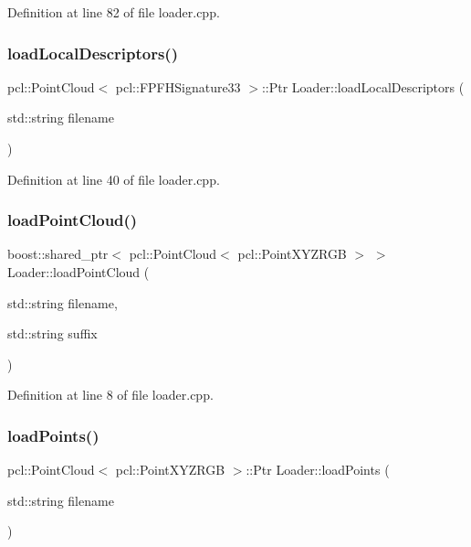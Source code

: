 Definition at line 82 of file loader.\+cpp.

\hypertarget{class_loader_ac8938fa9e01e40c2ff21574df60b003a}{}\label{class_loader_ac8938fa9e01e40c2ff21574df60b003a} 
\subsubsection{\texorpdfstring{load\+Local\+Descriptors()}{loadLocalDescriptors()}}
{\footnotesize\ttfamily pcl\+::\+Point\+Cloud$<$ pcl\+::\+F\+P\+F\+H\+Signature33 $>$\+::Ptr Loader\+::load\+Local\+Descriptors (\begin{DoxyParamCaption}\item[{std\+::string}]{filename }\end{DoxyParamCaption})}



Definition at line 40 of file loader.\+cpp.

\hypertarget{class_loader_a4a51dc0120d524c010fa2d61c96ffda0}{}\label{class_loader_a4a51dc0120d524c010fa2d61c96ffda0} 
\subsubsection{\texorpdfstring{load\+Point\+Cloud()}{loadPointCloud()}}
{\footnotesize\ttfamily boost\+::shared\+\_\+ptr$<$ pcl\+::\+Point\+Cloud$<$ pcl\+::\+Point\+X\+Y\+Z\+R\+GB $>$ $>$ Loader\+::load\+Point\+Cloud (\begin{DoxyParamCaption}\item[{std\+::string}]{filename,  }\item[{std\+::string}]{suffix }\end{DoxyParamCaption})}



Definition at line 8 of file loader.\+cpp.

\hypertarget{class_loader_ae74793144de5bbc0148c257b1f83e0eb}{}\label{class_loader_ae74793144de5bbc0148c257b1f83e0eb} 
\subsubsection{\texorpdfstring{load\+Points()}{loadPoints()}}
{\footnotesize\ttfamily pcl\+::\+Point\+Cloud$<$ pcl\+::\+Point\+X\+Y\+Z\+R\+GB $>$\+::Ptr Loader\+::load\+Points (\begin{DoxyParamCaption}\item[{std\+::string}]{filename }\end{DoxyParamCaption})}



